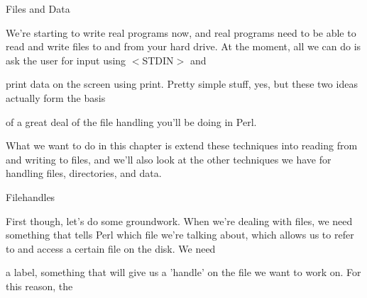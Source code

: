 \documentclass[a4paper,11pt]{book}
\begin{document}

\noindent 

\noindent 

\noindent 

\noindent 

\noindent 

\noindent 

\noindent 

\noindent 

\noindent 

\noindent 

\noindent 

\noindent 

\noindent 

\noindent 

\noindent 

\noindent Files and Data

\noindent 

\noindent 

\noindent 

\noindent 

\noindent We're starting to write real programs now, and real programs need to be able to read and write files to and from your hard drive. At the moment, all we can do is ask the user for input using $<$STDIN$>$ and

\noindent print data on the screen using print. Pretty simple stuff, yes, but these two ideas actually form the basis

\noindent of a great deal of the file handling you'll be doing in Perl.

\noindent 

\noindent What we want to do in this chapter is extend these techniques into reading from and writing to files, and we'll also look at the other techniques we have for handling files, directories, and data.

\noindent 

\noindent 

\noindent Filehandles

\noindent 

\noindent First though, let's do some groundwork. When we're dealing with files, we need something that tells Perl which file we're talking about, which allows us to refer to and access a certain file on the disk. We need

\noindent a label, something that will give us a 'handle' on the file we want to work on. For this reason, the
\end{document}
